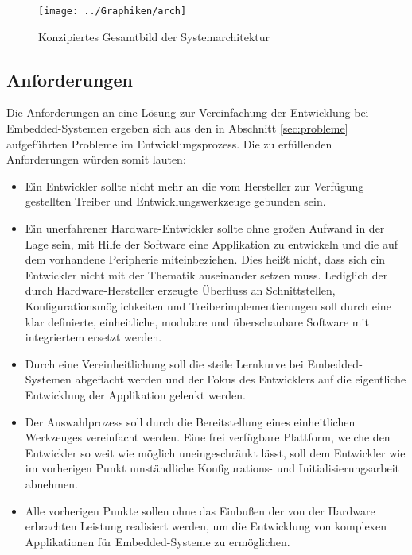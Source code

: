     \begin{figure}[h]
        \centering
        \caption{Konzipiertes Gesamtbild der Systemarchitektur}
        \label{fig:softwarecomp}
        \texttt{[image: ../Graphiken/arch]}
    \end{figure}

    \subsection{Anforderungen}
        \label{sec:demands}
        Die Anforderungen an eine Lösung zur Vereinfachung der Entwicklung bei Embedded\hyp{}Systemen ergeben sich aus den
        in Abschnitt \ref{sec:probleme} aufgeführten Probleme im Entwicklungsprozess.
        Die zu erfüllenden Anforderungen würden somit lauten:
        \begin{itemize}
            \item Ein Entwickler sollte nicht mehr an die vom Hersteller zur Verfügung gestellten Treiber und
            Entwicklungswerkzeuge gebunden sein.
            \item Ein unerfahrener Hardware-Entwickler sollte ohne großen Aufwand in der Lage sein, mit Hilfe der Software
            eine Applikation zu entwickeln und die auf dem  vorhandene Peripherie miteinbeziehen.
            Dies heißt nicht, dass sich ein Entwickler nicht mit der Thematik auseinander setzen muss. Lediglich der
            durch Hardware-Hersteller erzeugte Überfluss an Schnittstellen, Konfigurationsmöglichkeiten und Treiberimplementierungen
            soll durch eine klar definierte, einheitliche, modulare und überschaubare Software mit integriertem
             ersetzt werden.
            \item Durch eine Vereinheitlichung soll die steile Lernkurve bei Embedded-Systemen
            abgeflacht werden und der Fokus des Entwicklers auf die eigentliche Entwicklung der Applikation gelenkt werden.
            \item Der Auswahlprozess soll durch die Bereitstellung eines einheitlichen Werkzeuges vereinfacht werden.
            Eine frei verfügbare Plattform, welche den Entwickler so weit wie möglich uneingeschränkt lässt, soll dem
            Entwickler wie im vorherigen Punkt umständliche Konfigurations- und Initialisierungsarbeit abnehmen.
            \item Alle vorherigen Punkte sollen ohne das Einbußen der von der Hardware erbrachten Leistung realisiert
            werden, um die Entwicklung von komplexen Applikationen für Embedded-Systeme zu ermöglichen.
        \end{itemize}

